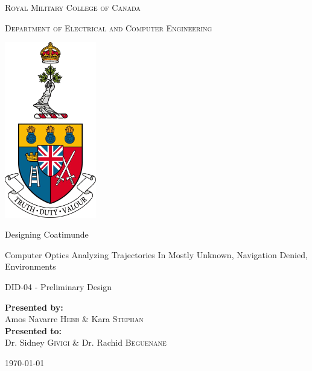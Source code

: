 \documentclass{article}
\begin{document}
	
\begin{titlepage}
	\begin{center}
		\vspace*{1cm}
		
		\LARGE\textsc{Royal Military College of Canada}\normalsize
		
		\vspace{0.2cm}
		
		\textsc{Department of Electrical and Computer Engineering}
		
		\vspace{1.5cm}
		
		\includegraphics[width=0.3\textwidth]{rmcLogo.png}
		
		\vspace{1.5cm}
		
		\LARGE{Designing Coatimunde\\}
		
		\vspace{0.2cm}
		
		\normalsize{Computer Optics Analyzing Trajectories In Mostly Unknown, Navigation Denied, Environments}
		
		\vspace{0.1cm}
		
		\normalsize{DID-04 - Preliminary Design}
		
		\vfill
		
		\textbf{Presented by:}\\Amos Navarre \textsc{Hebb} \& Kara \textsc{Stephan}\\
		\vspace{0.8cm}
		\textbf{Presented to:}\\Dr. Sidney \textsc{Givigi} \& Dr. Rachid \textsc{Beguenane}
		\vspace{0.8cm}
		
		\today
		
	\end{center}
\end{titlepage}
\end{document}
